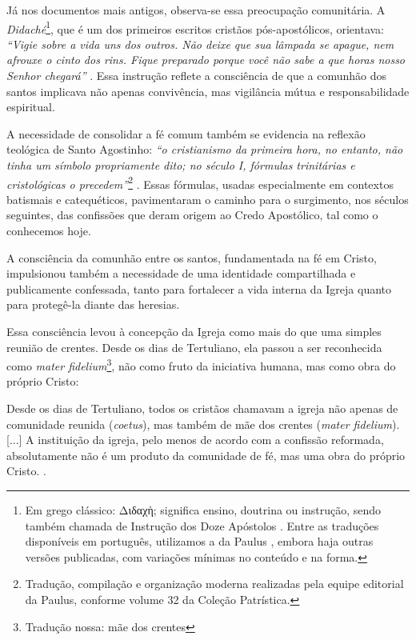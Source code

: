 Já nos documentos mais antigos, observa-se essa preocupação comunitária. A \textit{Didaché}\footnote{Em grego clássico: \foreignlanguage{greek}{Διδαχὴ}; significa ensino, doutrina ou instrução, sendo também chamada de Instrução dos Doze Apóstolos \cite{wikididaque}. Entre as traduções disponíveis em português, utilizamos a da Paulus \cite{didachePaulus2013}, embora haja outras versões publicadas, com variações mínimas no conteúdo e na forma.}, que é um dos primeiros escritos cristãos pós-apostólicos, orientava: \textit{``Vigie sobre a vida uns dos outros. Não deixe que sua lâmpada se apague, nem afrouxe o cinto dos rins. Fique preparado porque você não sabe a que horas nosso Senhor chegará''} \cite{didachePaulus2013}. Essa instrução reflete a consciência de que a comunhão dos santos implicava não apenas convivência, mas vigilância mútua e responsabilidade espiritual.

A necessidade de consolidar a fé comum também se evidencia na reflexão teológica de Santo Agostinho: \textit{``o cristianismo da primeira hora, no entanto, não tinha um símbolo propriamente dito; no século I, fórmulas trinitárias e cristológicas o precedem''}\footnote{Tradução, compilação e organização moderna realizadas pela equipe editorial da Paulus, conforme volume 32 da Coleção Patrística.} \cite[p.~8]{santos2013}. Essas fórmulas, usadas especialmente em contextos batismais e catequéticos, pavimentaram o caminho para o surgimento, nos séculos seguintes, das confissões que deram origem ao Credo Apostólico, tal como o conhecemos hoje.

A consciência da comunhão entre os santos, fundamentada na fé em Cristo, impulsionou também a necessidade de uma identidade compartilhada e publicamente confessada, tanto para fortalecer a vida interna da Igreja quanto para protegê-la diante das heresias.

Essa consciência levou à concepção da Igreja como mais do que uma simples reunião de crentes. Desde os dias de Tertuliano, ela passou a ser reconhecida como \textit{mater fidelium}\footnote{Tradução nossa: mãe dos crentes}, não como fruto da iniciativa humana, mas como obra do próprio Cristo:

\begin{citacao}
    Desde os dias de Tertuliano, todos os cristãos chamavam a igreja não apenas de comunidade reunida (\textit{coetus}), mas também de mãe dos crentes (\textit{mater fidelium}). [...] A instituição da igreja, pelo menos de acordo com a confissão reformada, absolutamente não é um produto da comunidade de fé, mas uma obra do próprio Cristo. \cite[p.~335]{bavinck2012}.
\end{citacao}

